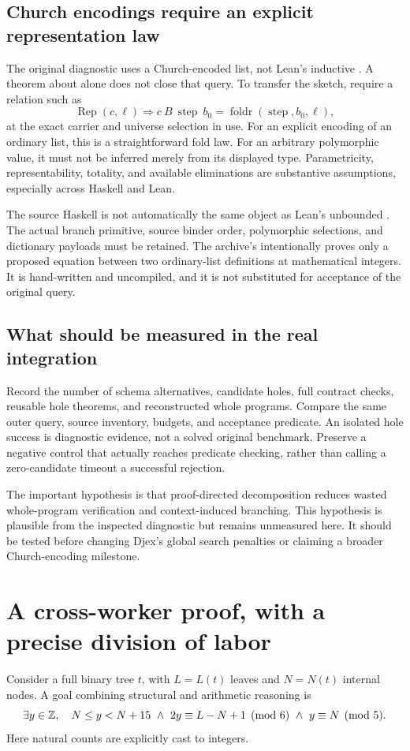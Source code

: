 \subsection{Church encodings require an explicit representation law}
\label{sec:church}
The original diagnostic uses a Church-encoded list, not Lean's inductive
. A theorem about  alone does not close that query.
To transfer the sketch, require a relation such as
\[
 \operatorname{Rep}(c,\ell)\Longrightarrow
 c\ B\ \operatorname{step}\ b_0
 =\operatorname{foldr}(\operatorname{step},b_0,\ell),
\]
at the exact carrier and universe selection in use. For an explicit encoding
of an ordinary list, this is a straightforward fold law. For an arbitrary
polymorphic value, it must not be inferred merely from its displayed type.
Parametricity, representability, totality, and available eliminations are
substantive assumptions, especially across Haskell and Lean.

The source Haskell  is not automatically the same object as Lean's
unbounded . The actual branch primitive, source binder order,
polymorphic selections, and dictionary payloads must be retained. The archive's
 intentionally proves only a proposed equation between
two ordinary-list definitions at mathematical integers. It is hand-written and
uncompiled, and it is not substituted for acceptance of the original query.

\subsection{What should be measured in the real integration}
Record the number of schema alternatives, candidate holes, full contract checks,
reusable hole theorems, and reconstructed whole programs. Compare the same outer
query, source inventory, budgets, and acceptance predicate. An isolated hole
success is diagnostic evidence, not a solved original benchmark. Preserve a
negative control that actually reaches predicate checking, rather than calling a
zero-candidate timeout a successful rejection.

The important hypothesis is that proof-directed decomposition reduces wasted
whole-program verification and context-induced branching. This hypothesis is
plausible from the inspected diagnostic but remains unmeasured here. It should
be tested before changing Djex's global search penalties or claiming a broader
Church-encoding milestone.

\section{A cross-worker proof, with a precise division of labor}
\label{sec:composition}
Consider a full binary tree $t$, with $L=L(t)$ leaves and $N=N(t)$ internal
nodes. A goal combining structural and arithmetic reasoning is
\begin{equation}
\label{eq:combined-goal}
 \exists y\in\mathbb{Z},\quad
 N\le y<N+15
 \ \land\ 2y\equiv L-N+1\pmod6
 \ \land\ y\equiv N\pmod5.
\end{equation}
Here natural counts are explicitly cast to integers.

